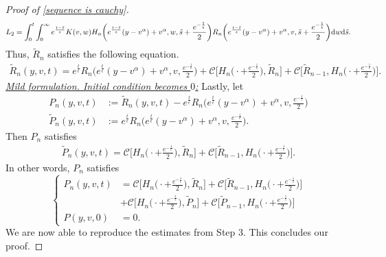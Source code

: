 \documentclass[11pt]{article}
\numberwithin{equation}{section}
\newcommand{\der}{\textup{d}}
\begin{document}
\begin{proof}[Proof of \eqref{sequence is cauchy}]
\begin{align*}
L_{2}=\int_{0}^{t}\int_{0}^{\infty}e^{\frac{t-\tilde{s}}{\epsilon}}K(v,w)H_{n}\bigg(e^{\frac{t-\tilde{s}}{\epsilon}}(y-v^{\alpha})+v^{\alpha},w,\tilde{s}+\frac{e^{-\frac{1}{\epsilon}}}{2}\bigg)R_{n}\bigg(e^{\frac{t-\tilde{s}}{\epsilon}}(y-v^{\alpha})+v^{\alpha},v,\tilde{s}+\frac{e^{-\frac{1}{\epsilon}}}{2}\bigg)\der w\der \tilde{s}.
\end{align*}
Thus, $\tilde{R}_{n}$ satisfies the following equation.
\begin{align*}
    \tilde{R}_{n}(y,v,t)=e^{\frac{t}{\epsilon}}R_{n}\bigg(e^{\frac{t}{\epsilon}}(y-v^{\alpha})+v^{\alpha},v,\frac{e^{-\frac{1}{\epsilon}}}{2}\bigg)+\mathcal{C}\bigg[H_{n}\bigg(\cdot+\frac{e^{-\frac{1}{\epsilon}}}{2}\bigg),\tilde{R}_n\bigg]+\mathcal{C}\bigg[\tilde{R}_{n-1},H_{n}\bigg(\cdot+\frac{e^{-\frac{1}{\epsilon}}}{2}\bigg)\bigg].
\end{align*}
  \textit{\underline{Mild formulation. Initial condition becomes $0$:}}    Lastly, let 
   \begin{align*}
       P_{n}(y,v,t)&:=\tilde{R}_{n}(y,v,t)-e^{\frac{t}{\epsilon}}R_{n}\bigg(e^{\frac{t}{\epsilon}}(y-v^{\alpha})+v^{\alpha},v,\frac{e^{-\frac{1}{\epsilon}}}{2}\bigg)\\ \tilde{P}_{n}(y,v,t)&:=e^{\frac{t}{\epsilon}}R_{n}\bigg(e^{\frac{t}{\epsilon}}(y-v^{\alpha})+v^{\alpha},v,\frac{e^{-\frac{1}{\epsilon}}}{2}\bigg).
   \end{align*}
   Then $P_{n}$ satisfies
   \begin{align*}
    \tilde{P}_{n}(y,v,t)=\mathcal{C}\bigg[H_{n}\bigg(\cdot+\frac{e^{-\frac{1}{\epsilon}}}{2}\bigg),\tilde{R}_n\bigg]+\mathcal{C}\bigg[\tilde{R}_{n-1},H_{n}\bigg(\cdot+\frac{e^{-\frac{1}{\epsilon}}}{2}\bigg)\bigg].
   \end{align*}
   In other words, $P_{n}$ satisfies
   \begin{equation}
\left\{\begin{aligned}
 P_n(y,v,t)&=\mathcal{C}\bigg[H_{n}\bigg(\cdot+\frac{e^{-\frac{1}{\epsilon}}}{2}\bigg),\tilde{R}_n\bigg]+\mathcal{C}\bigg[\tilde{R}_{n-1},H_{n}\bigg(\cdot+\frac{e^{-\frac{1}{\epsilon}}}{2}\bigg)\bigg] \\
&+\mathcal{C}\bigg[H_{n}\bigg(\cdot+\frac{e^{-\frac{1}{\epsilon}}}{2}\bigg), \tilde{P}_{n}\bigg]+\mathcal{C}\bigg[ \tilde{P}_{n-1},H_{n}\bigg(\cdot+\frac{e^{-\frac{1}{\epsilon}}}{2}\bigg)\bigg]\\
P(y,v,0)&=0.
   \end{aligned}\right.
   \end{equation}
We are now able to reproduce the estimates from Step $3.$  This concludes our proof.\end{proof}
\end{document}
